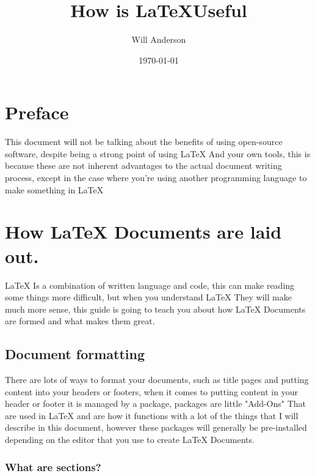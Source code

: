 \documentclass[12pt, letterpaper, oneside]{article} \usepackage[utf8]{inputenc}
\title{How is \LaTeX Useful}
\author{Will Anderson}
\date{\today}
\begin{document}
\maketitle

\newpage
\clearpage
\setcounter{page}{1}
\tableofcontents

\listoffigures

\newpage

\section*{Preface}

This document will not be talking about the benefits of using open-source software, despite being a strong point of using \LaTeX{} And your own tools, this is because these are not inherent advantages to the actual document writing process, except in the case where you're using another programming language to make something in \LaTeX{}

\newpage

\section{How \LaTeX{} Documents are laid out.}

\LaTeX{} Is a combination of written language and code, this can make reading some things more difficult, but when you understand \LaTeX{} They will make much more sense, this guide is going to teach you about how \LaTeX{} Documents are formed and what makes them great.

\subsection{Document formatting}

There are lots of ways to format your documents, such as title pages and putting content into your headers or footers, when it comes to putting content in your header or footer it is managed by a package, packages are little "Add-Ons" That are used in \LaTeX{} and are how it functions with a lot of the things that I will describe in this document, however these packages will generally be pre-installed depending on the editor that you use to create \LaTeX{} Documents.



\subsubsection{What are sections?}
\end{document}
